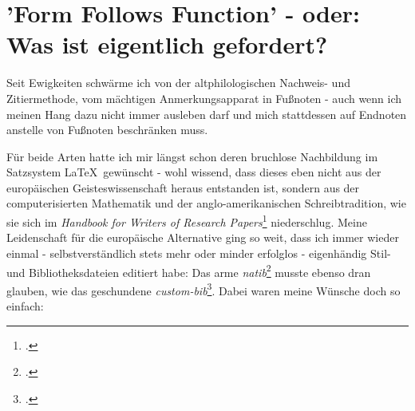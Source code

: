 %
%
%
%
\section{'Form Follows Function' - oder: Was ist eigentlich gefordert?}

Seit Ewigkeiten schwärme ich von der altphilologischen Nachweis- und
Zitiermethode, vom mächtigen Anmerkungsapparat in Fußnoten - auch wenn ich
meinen Hang dazu nicht immer ausleben darf und mich stattdessen auf Endnoten
anstelle von Fußnoten beschränken muss.

Für beide Arten hatte ich mir längst schon deren bruchlose Nachbildung im
Satzsystem \LaTeX\ gewünscht - wohl wissend, dass dieses eben nicht aus der
europäischen Geisteswissenschaft heraus entstanden ist, sondern aus der
computerisierten Mathematik und der anglo-amerikanischen Schreibtradition, wie
sie sich im \textit{Handbook for Writers of Research
Papers}\footcite[vgl.][]{ModLanAss2009a} niederschlug. Meine Leidenschaft für
die europäische Alternative ging so weit, dass ich immer wieder einmal -
selbstverständlich stets mehr oder minder erfolglos - eigenhändig Stil- und
Bibliotheksdateien editiert habe: Das arme
\emph{natib}\footcite[vgl.][]{Daly2000a} musste ebenso dran glauben, wie das
geschundene \emph{custom-bib}\footcite[vgl.][]{Daly2007a}. Dabei waren meine
Wünsche doch so einfach:

